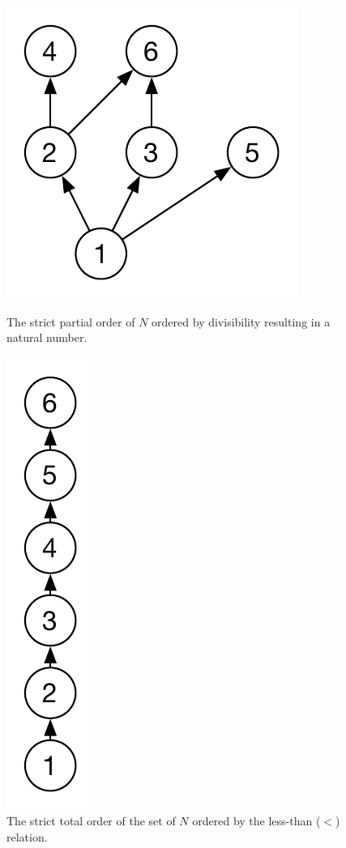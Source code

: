 		\begin{figure}[H]
		\centering
		\begin{minipage}{0.45\textwidth}
			\centering
			\includegraphics[height=\textheight/5]{2background/images/strict-partial.pdf}
		\caption{The strict partial order of $N$ ordered by divisibility resulting in a natural number.}
		\label{fig:background:strict-partial}
		\end{minipage}\hfill
		\begin{minipage}{0.45\textwidth}
			\centering
			\includegraphics[height=\textheight/5]{2background/images/strict-total.pdf}
		\caption{The strict total order of the set of $N$ ordered by the less-than ($<$) relation.}
		\label{fig:background:strict-total}
		\end{minipage}
		\end{figure}
		
